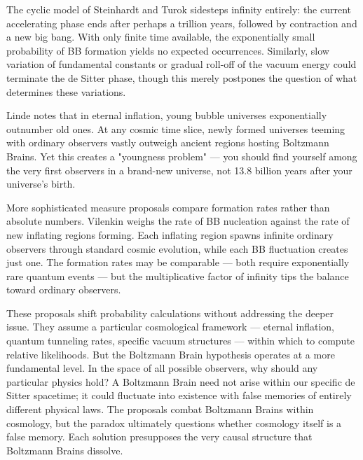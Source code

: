 The cyclic model of Steinhardt and Turok sidesteps infinity entirely: the current accelerating phase ends after perhaps a trillion years, followed by contraction and a new big bang. With only finite time available, the exponentially small probability of BB formation yields no expected occurrences. Similarly, slow variation of fundamental constants or gradual roll-off of the vacuum energy could terminate the de Sitter phase, though this merely postpones the question of what determines these variations.

Linde notes that in eternal inflation, young bubble universes exponentially outnumber old ones. At any cosmic time slice, newly formed universes teeming with ordinary observers vastly outweigh ancient regions hosting Boltzmann Brains. Yet this creates a "youngness problem" — you should find yourself among the very first observers in a brand-new universe, not 13.8 billion years after your universe's birth.

More sophisticated measure proposals compare formation rates rather than absolute numbers. Vilenkin weighs the rate of BB nucleation against the rate of new inflating regions forming. Each inflating region spawns infinite ordinary observers through standard cosmic evolution, while each BB fluctuation creates just one. The formation rates may be comparable — both require exponentially rare quantum events — but the multiplicative factor of infinity tips the balance toward ordinary observers.

These proposals shift probability calculations without addressing the deeper issue. They assume a particular cosmological framework — eternal inflation, quantum tunneling rates, specific vacuum structures — within which to compute relative likelihoods. But the Boltzmann Brain hypothesis operates at a more fundamental level. In the space of all possible observers, why should any particular physics hold? A Boltzmann Brain need not arise within our specific de Sitter spacetime; it could fluctuate into existence with false memories of entirely different physical laws. The proposals combat Boltzmann Brains within cosmology, but the paradox ultimately questions whether cosmology itself is a false memory. Each solution presupposes the very causal structure that Boltzmann Brains dissolve.


